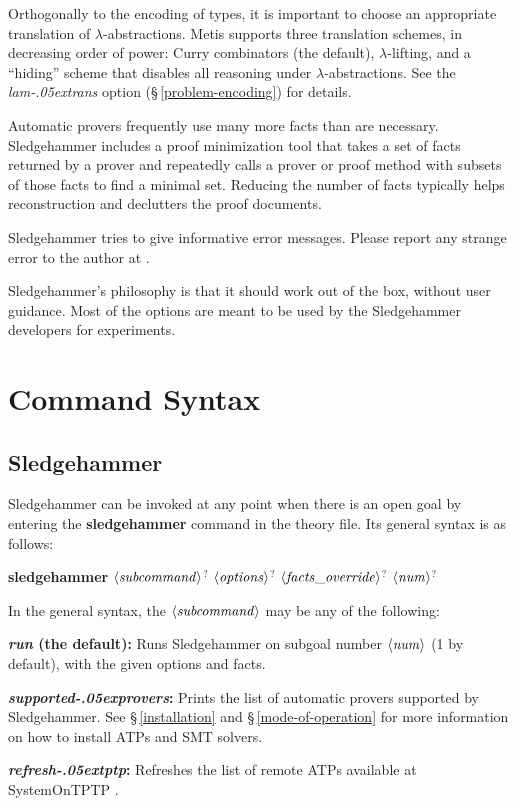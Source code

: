 \documentclass[a4paper,12pt]{article}
\let\oldS=\S
\def\S{\oldS\,}
\def\qty#1{\ensuremath{\left<\mathit{#1\/}\right>}}
\renewcommand\_{\hbox{\textunderscore\kern-.05ex}}
\begin{document}
Orthogonally to the encoding of types, it is important to choose an appropriate
translation of $\lambda$-abstractions. Metis supports three translation
schemes, in decreasing order of power: Curry combinators (the default),
$\lambda$-lifting, and a ``hiding'' scheme that disables all reasoning under
$\lambda$-abstractions. See the \textit{lam\_trans} option
(\S\ref{problem-encoding}) for details.



Automatic provers frequently use many more facts than are necessary.
Sledgehammer includes a proof minimization tool that takes a set of facts
returned by a prover and repeatedly calls a prover or proof method with subsets
of those facts to find a minimal set. Reducing the number of facts typically
helps reconstruction and declutters the proof documents.



Sledgehammer tries to give informative error messages. Please report any strange
error to the author at \authoremail.



Sledgehammer's philosophy is that it should work out of the box, without user
guidance. Most of the options are meant to be used by the Sledgehammer
developers for experiments.


\section{Command Syntax}
\label{command-syntax}

\subsection{Sledgehammer}
\label{sledgehammer}

Sledgehammer can be invoked at any point when there is an open goal by entering
the \textbf{sledgehammer} command in the theory file. Its general syntax is as
follows:

\prew
\textbf{sledgehammer} \qty{subcommand}$^?$ \qty{options}$^?$ \qty{facts\_override}$^?$ \qty{num}$^?$
\postw

In the general syntax, the \qty{subcommand} may be any of the following:

\begin{enum}
\item[\labelitemi] \textbf{\textit{run} (the default):} Runs Sledgehammer on
subgoal number \qty{num} (1 by default), with the given options and facts.

\item[\labelitemi] \textbf{\textit{supported\_provers}:} Prints the list of
automatic provers supported by Sledgehammer. See \S\ref{installation} and
\S\ref{mode-of-operation} for more information on how to install ATPs and SMT
solvers.

\item[\labelitemi] \textbf{\textit{refresh\_tptp}:} Refreshes the list of remote
ATPs available at System\-On\-TPTP \cite{sutcliffe-2000}.
\end{enum}
\end{document}
